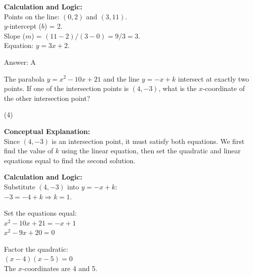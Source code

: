 \documentclass[11pt,paper=a4,answers]{exam}
\begin{document}
\begin{questions}
\begin{solution}
\textbf{Calculation and Logic:} \\
Points on the line: $(0, 2)$ and $(3, 11)$. \\
$y$-intercept ($b$) = 2. \\
Slope ($m$) = $(11 - 2) / (3 - 0) = 9 / 3 = 3$. \\
Equation: $y = 3x + 2$.

\vspace{25pt}

Answer: \colorbox{yellow!100}{A}
\end{solution}


\question
The parabola $y = x^2 - 10x + 21$ and the line $y = -x + k$ intersect at exactly two points. If one of the intersection points is $(4, -3)$, what is the $x$-coordinate of the other intersection point?
\begin{tasks}(4)
\end{tasks}

\begin{solution}
\textbf{Conceptual Explanation:} \\
Since $(4, -3)$ is an intersection point, it must satisfy both equations. We first find the value of $k$ using the linear equation, then set the quadratic and linear equations equal to find the second solution.

\vspace{20pt}

\textbf{Calculation and Logic:} \\
Substitute $(4, -3)$ into $y = -x + k$: \\
$-3 = -4 + k \Rightarrow k = 1$.

\vspace{10pt}

Set the equations equal: \\
$x^2 - 10x + 21 = -x + 1$ \\
$x^2 - 9x + 20 = 0$

\vspace{10pt}

Factor the quadratic: \\
$(x - 4)(x - 5) = 0$ \\
The $x$-coordinates are 4 and 5.

\vspace{10pt}


\end{solution}
\end{questions}
\end{document}
